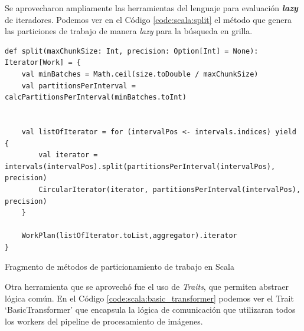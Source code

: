 \documentclass[11pt]{article}
\begin{document}
Se aprovecharon ampliamente las herramientas del lenguaje para evaluación \textbf{\textit{lazy}} de iteradores. Podemos ver en el Código \ref{code:scala:split} el método que genera las particiones de trabajo de manera \textit{lazy} para la búsqueda en grilla.

\begin{listing}[ht]
\begin{verbatim}
def split(maxChunkSize: Int, precision: Option[Int] = None): Iterator[Work] = {
    val minBatches = Math.ceil(size.toDouble / maxChunkSize)
    val partitionsPerInterval = calcPartitionsPerInterval(minBatches.toInt)


    val listOfIterator = for (intervalPos <- intervals.indices) yield {
        val iterator = intervals(intervalPos).split(partitionsPerInterval(intervalPos), precision)
        CircularIterator(iterator, partitionsPerInterval(intervalPos), precision)
    }

    WorkPlan(listOfIterator.toList,aggregator).iterator
}
\end{verbatim}
\caption{Fragmento de métodos de particionamiento de trabajo en Scala}
\label{code:scala:split}
\end{listing}

Otra herramienta que se aprovechó fue el uso de \textit{Traits}, que permiten abstraer lógica común. En el Código \ref{code:scala:basic_transformer} podemos ver el Trait `BasicTransformer' que encapsula la lógica de comunicación que utilizaran todos los workers del pipeline de procesamiento de imágenes.
\end{document}
